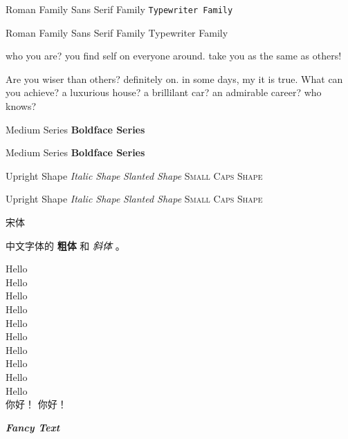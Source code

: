 \documentclass[10pt]{article} %
\newcommand{\myfont}{\textit{\textbf{\textsf{Fancy Text}}}}
\begin{document}
    \textrm{Roman Family} \textsf{Sans Serif Family} \texttt{Typewriter Family}    
    
    {\rmfamily Roman Family} {\sffamily Sans Serif Family} {\ttfamily Typewriter Family}
    
    {\sffamily who you are? you find self on everyone around. take you as the same as others!}
    
    {\ttfamily Are you wiser than others? definitely on. in some days, my it is true. What can you achieve? a luxurious house? a brillilant car? an admirable career? who knows?}
    
    \textmd{Medium Series} \textbf{Boldface Series}
    
    {\mdseries Medium Series} {\bfseries Boldface Series}
    
    \textup{Upright Shape} \textit{Italic Shape} \textsl{Slanted Shape} \textsc{Small Caps Shape}
    
    {\upshape Upright Shape} {\itshape Italic Shape} {\slshape Slanted Shape} {\scshape Small Caps Shape}
    
    {\songti 宋体}   
    
    中文字体的 \textbf{粗体} 和 \textit{斜体} 。
    
    {\tiny           Hello}\\
    {\scriptsize     Hello}\\
    {\footnotesize   Hello}\\
    {\small          Hello}\\
    {\normalsize      Hello}\\
    {\large          Hello}\\
    {\Large          Hello}\\
    {\LARGE          Hello}\\
    {\huge           Hello}\\
    {\Huge           Hello}\\
    
     你好！
     你好！
    
    \myfont
    
\end{document}

